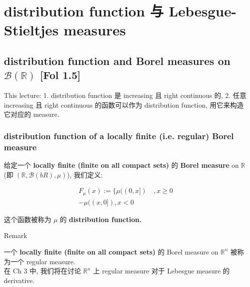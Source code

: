 \chapter{distribution function 与 Lebesgue-Stieltjes measures}\label{distribution-function-ux4e0e-lebesgue-stieltjes-measures}

\section{\texorpdfstring{distribution function and Borel measures on \(\mathcal{B}(\mathbb{R})\) {[}Fol 1.5{]}}{distribution function and Borel measures on \textbackslash mathcal\{B\}(\textbackslash mathbb\{R\}) {[}Fol 1.5{]}}}

This lecture: 1. distribution function 是 increasing 且 right continuous 的, 2. 任意 increasing 且 right continuous 的函数可以作为 distribution function, 用它来构造它对应的 measure.

\subsection{distribution function of a locally finite (i.e. regular) Borel measure}\label{distribution-function-of-a-locally-finite-i.e.-regular-borel-measure}

\begin{definition}{}

给定一个 \textbf{locally finite (finite on all compact sets)} 的 \textbf{Borel measure} on \(\mathbb{R}\) (即 \((\mathbb{R},\mathcal{B}(bR),\mu)\)), 我们定义:

\[\begin{matrix}
{F_{\mu}(x) := \{\mu((0,x\rbrack)\quad,x \geq 0} \\
{- \mu((x,0\rbrack),x < 0}
\end{matrix}\]

这个函数被称为 \(\mu\) 的 \textbf{distribution function.}

\end{definition}

\begin{qlremark}{Remark}

一个 \textbf{locally finite (finite on all compact sets)} 的 Borel measure on \(\mathbb{R}^{n}\) 被称为一个 regular measure.\\
在 Ch 3 中, 我们将在讨论 \(\mathbb{R}^{n}\) 上 regular measure 对于 Lebesgue measure 的 derivative.

\end{qlremark}

